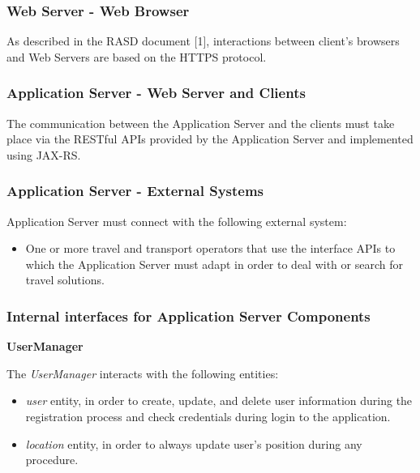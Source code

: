 \documentclass{article}
\begin{document}
	\subsubsection{Web Server - Web Browser}
	As described in the RASD document [1], interactions between client’s  browsers and Web Servers are based on the HTTPS protocol.


	\subsubsection{Application Server - Web Server and Clients}
	The communication between the Application Server and the clients must take place via the RESTful APIs provided by the Application Server and implemented using JAX-RS.


	\subsubsection{Application Server - External Systems}
	Application Server must connect with the following external system:
	\begin{itemize}
	\item One or more travel and transport operators that use the interface APIs to which the Application Server must adapt in order to deal with or search for travel solutions.
	\end{itemize}


	\subsubsection{Internal interfaces for Application Server Components}
	\bigskip
	\noindent
	\textbf{UserManager}
	
	\bigskip
	\noindent
	The \textit{UserManager} interacts with the following entities:
	\begin{itemize}
	\item \textit{user} entity, in order to create, update, and delete user information during the registration process and check credentials during login to the application.
	\item \textit{location} entity, in order to always update user's position during any procedure.
	\end{itemize}
\end{document}
